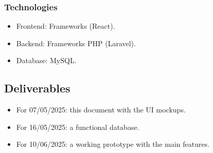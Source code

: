 \subsubsection{Technologies}
\begin{itemize}
    \item Frontend: Frameworks (React).
    \item Backend: Frameworks PHP (Laravel).
    \item Database: MySQL.
\end{itemize}

\subsection{Deliverables}
\begin{itemize}
    \item For 07/05/2025: this document with the UI mockups.
    \item For 16/05/2025: a functional database.
    \item For 10/06/2025: a working prototype with the main features.
\end{itemize}
